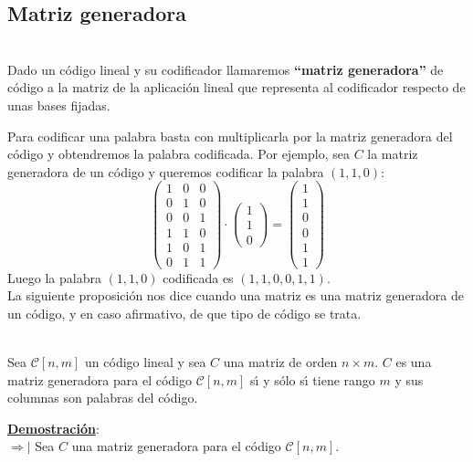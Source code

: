 \subsection{Matriz generadora}

\begin{definicion}
\ \\
Dado un c\'odigo lineal y su codificador llamaremos \textbf{``matriz
generadora''} de c\'odigo a la matriz de la aplicaci\'on lineal que representa
al codificador respecto de unas bases fijadas.
\end{definicion}
Para codificar una palabra basta con multiplicarla por la matriz generadora del
c\'odigo y obtendremos la palabra codificada. Por ejemplo, sea $C$ la matriz
generadora de un c\'odigo y queremos codificar la palabra $(1,1,0)$:
\begin{displaymath}
\left( \begin{array}{ccc}
1&0&0\\
0&1&0\\
0&0&1\\
1&1&0\\
1&0&1\\
0&1&1
\end{array} \right) \cdot
\left( \begin{array}{c}
1\\
1\\
0
\end{array} \right) =
\left( \begin{array}{c}
1\\
1\\
0\\
0\\
1\\
1
\end{array} \right)
\end{displaymath}
Luego la palabra $(1,1,0)$ codificada es $(1,1,0,0,1,1)$.\\ 

La siguiente proposici\'on nos dice cuando una matriz es una matriz generadora
de un c\'odigo, y en caso afirmativo, de que tipo de c\'odigo se trata.

\begin{proposicion}
\ \\
Sea $\mathcal{C}[n,m]$ un c\'odigo lineal y sea $C$ una matriz de orden
$n\times m$. $C$ es una matriz generadora para el c\'odigo $\mathcal{C}[n,m]$
s\'{\i} y s\'olo s\'{\i} tiene rango $m$ y sus columnas son palabras del
c\'odigo.
\end{proposicion}
\underline{\textbf{Demostraci\'on}}:\\
$\Rightarrow |$ Sea $C$ una matriz generadora para el c\'odigo
$\mathcal{C}[n,m]$. \\

